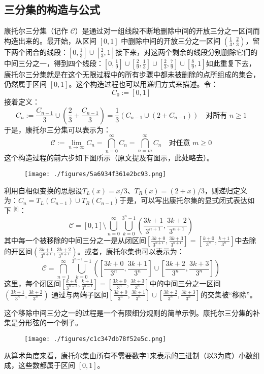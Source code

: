 \subsection{三分集的构造与公式}
康托尔三分集（记作 $\mathcal{C}$）是通过对一组线段不断地删除中间的开放三分之一区间而构造出来的。最开始，从区间 $[0, 1]$ 中删除中间的开放三分之一区间 $\left(\frac{1}{3}, \frac{2}{3}\right)$，留下两个闭合的线段：$\left[0, \frac{1}{3}\right] \cup \left[\frac{2}{3}, 1\right]$接下来，对这两个剩余的线段分别删除它们的中间三分之一，得到四个线段：$\left[0, \frac{1}{9}\right] \cup \left[\frac{2}{9}, \frac{1}{3}\right] \cup \left[\frac{2}{3}, \frac{7}{9}\right] \cup \left[\frac{8}{9}, 1\right]$如此重复下去，康托尔三分集就是在这个无限过程中的所有步骤中都未被删除的点所组成的集合，仍然属于区间 $[0, 1]$。这个构造过程也可以用递归方式来描述。令：
$$
C_0 := [0, 1]~
$$
接着定义：
$$
C_n := \frac{C_{n-1}}{3} \cup \left(\frac{2}{3} +\frac{C_{n-1}}{3}\right) = \frac{1}{3} \left(C_{n-1} \cup (2 + C_{n-1})\right)
\quad \text{对所有 } n \geq 1~
$$
于是，康托尔三分集可以表示为：
$$
\mathcal{C} := \lim_{n \to \infty} C_n = \bigcap_{n=0}^{\infty} C_n = \bigcap_{n=m}^{\infty} C_n \quad \text{对任意 } m \geq 0~
$$
这个构造过程的前六步如下图所示（原文提及有图示，此处略去）。
\begin{figure}[ht]
\centering
\texttt{[image: ./figures/5a6934f361e2bc93.png]}
\caption{} \label{fig_KTRJ_1}
\end{figure}
利用自相似变换的思想设$T_L(x) = x/3$、$T_R(x) = (2 + x)/3$，则递归定义为：$C_n = T_L(C_{n-1}) \cup T_R(C_{n-1})$于是，可以写出康托尔集的显式闭式表达如下 \(^\text{[8]}\)：
$$
\mathcal{C} = [0, 1] \setminus \bigcup_{n=0}^{\infty} \bigcup_{k=0}^{3^n - 1} \left( \frac{3k+1}{3^{n+1}}, \frac{3k+2}{3^{n+1}} \right)~
$$
其中每一个被移除的中间三分之一是从闭区间$\left[ \frac{3k+0}{3^{n+1}}, \frac{3k+3}{3^{n+1}} \right] = \left[ \frac{k+0}{3^n}, \frac{k+1}{3^n} \right]$中去除的开区间$\left( \frac{3k+1}{3^{n+1}}, \frac{3k+2}{3^{n+1}} \right)$。或者，康托尔集也可以表示为：
$$
\mathcal{C} = \bigcap_{n=1}^{\infty} \bigcup_{k=0}^{3^{n-1}-1} \left( \left[ \frac{3k+0}{3^n}, \frac{3k+1}{3^n} \right] \cup \left[ \frac{3k+2}{3^n}, \frac{3k+3}{3^n} \right] \right)~
$$
这里，每个闭区间$\left[\frac{k+0}{3^{n-1}}, \frac{k+1}{3^{n-1}}\right] = \left[\frac{3k+0}{3^n}, \frac{3k+3}{3^n}\right]$中的中间三分之一区间$\left(\frac{3k+1}{3^n}, \frac{3k+2}{3^n}\right)$
通过与两端子区间$\left[\frac{3k+0}{3^n}, \frac{3k+1}{3^n}\right] \cup \left[\frac{3k+2}{3^n}, \frac{3k+3}{3^n}\right]$的交集被“移除”。

这个移除中间三分之一的过程是一个有限细分规则的简单示例。康托尔三分集的补集是分形弦的一个例子。
\begin{figure}[ht]
\centering
\texttt{[image: ./figures/c1c347db78f52e5c.png]}
\caption{} \label{fig_KTRJ_2}
\end{figure}
从算术角度来看，康托尔集由所有不需要数字1来表示的三进制（以3为底）小数组成，这些数都属于区间 $[0, 1]$。

